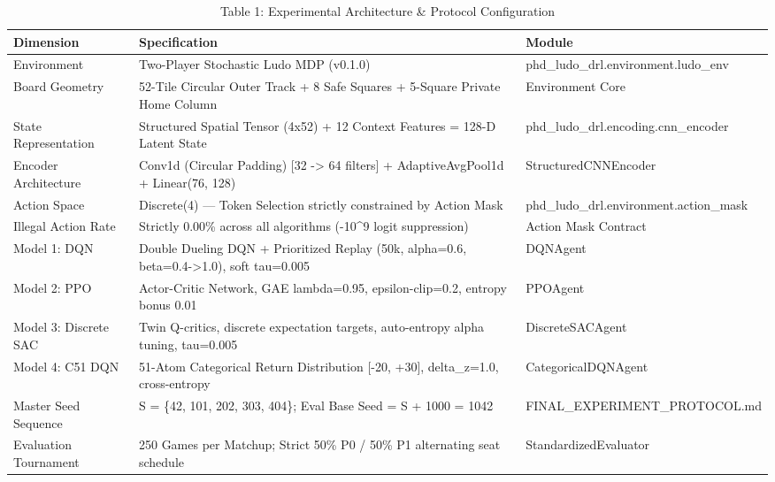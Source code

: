 \begin{table}
\caption{Table 1: Experimental Architecture & Protocol Configuration}
\label{tab:table_experimental_configuration}
\begin{tabular}{lll}
\toprule
Dimension & Specification & Module \\
\midrule
Environment & Two-Player Stochastic Ludo MDP (v0.1.0) & phd\_ludo\_drl.environment.ludo\_env \\
Board Geometry & 52-Tile Circular Outer Track + 8 Safe Squares + 5-Square Private Home Column & Environment Core \\
State Representation & Structured Spatial Tensor (4x52) + 12 Context Features = 128-D Latent State & phd\_ludo\_drl.encoding.cnn\_encoder \\
Encoder Architecture & Conv1d (Circular Padding) [32 -> 64 filters] + AdaptiveAvgPool1d + Linear(76, 128) & StructuredCNNEncoder \\
Action Space & Discrete(4) — Token Selection strictly constrained by Action Mask & phd\_ludo\_drl.environment.action\_mask \\
Illegal Action Rate & Strictly 0.00\% across all algorithms (-10\textasciicircum 9 logit suppression) & Action Mask Contract \\
Model 1: DQN & Double Dueling DQN + Prioritized Replay (50k, alpha=0.6, beta=0.4->1.0), soft tau=0.005 & DQNAgent \\
Model 2: PPO & Actor-Critic Network, GAE lambda=0.95, epsilon-clip=0.2, entropy bonus 0.01 & PPOAgent \\
Model 3: Discrete SAC & Twin Q-critics, discrete expectation targets, auto-entropy alpha tuning, tau=0.005 & DiscreteSACAgent \\
Model 4: C51 DQN & 51-Atom Categorical Return Distribution [-20, +30], delta\_z=1.0, cross-entropy & CategoricalDQNAgent \\
Master Seed Sequence & S = \{42, 101, 202, 303, 404\}; Eval Base Seed = S + 1000 = 1042 & FINAL\_EXPERIMENT\_PROTOCOL.md \\
Evaluation Tournament & 250 Games per Matchup; Strict 50\% P0 / 50\% P1 alternating seat schedule & StandardizedEvaluator \\
\bottomrule
\end{tabular}
\end{table}
